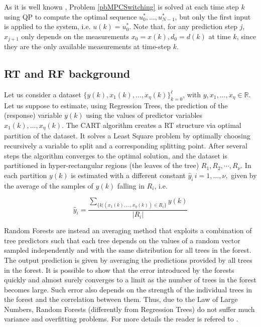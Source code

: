 \noindent As it is well known \cite{borrelli2017predictive}, Problem \ref{pbMPCSwitching} is solved at each time step $k$ using QP to compute the optimal sequence $u^*_0,\ldots,u^*_{N-1}$, but only the first input is applied to the system, i.e. $u(k) = u^*_0$. Note that, for any prediction step $j$, $x_{j+1}$ only depends on the measurements $x_0=x(k),d_0=d(k)$ at time $k$, since they are the only available measurements at time-step $k$. 


\subsection{RT and RF background} Let us consider a dataset $\{y(k),x_1(k),\ldots,x_\eta(k)\}_{k=0}^\ell$, with $y,x_1,\ldots,x_\eta\in\mathbb{R}$. Let us suppose  to estimate, using Regression Trees, the prediction of the (response) variable $y(k)$ using the values of predictor variables $x_1(k),\ldots,x_\eta(k)$. The CART algorithm \cite{BreimanCART2017} creates a RT structure via optimal partition of the dataset. It solves a Least Square problem by optimally choosing recursively a variable to split and a corresponding splitting point. After several steps the algorithm converges to the optimal solution, and the dataset is partitioned in hyper-rectangular regions (the leaves of the tree) $R_1, R_2,\cdots, R_\nu$. In each partition $y(k)$ is estimated with a different constant $\hat y_i\, i=1,\ldots,\nu,$ given by the average of the samples of $y(k)$ falling in $R_i$, i.e.

\begin{equation}\label{eqAverageResponseRT}
\hat y_{i} = \frac{\sum\limits_{\{k|(x_1(k),\ldots, x_\eta(k)) \in R_i\}}y(k)}{|R_i|}
\end{equation}


\noindent Random Forests \cite{BreimanML2001} are instead an averaging method that exploits a combination of tree predictors such that each tree depends on the values of a random vector sampled independently and with the same distribution for all trees in the forest. The output prediction is given by averaging the predictions provided by all trees in the forest. It is possible to show that the error introduced by the forests quickly and almost surely converges to a limit as the number of trees in the forest becomes large. Such error also depends on the strength of the individual trees in the forest and the correlation between them. Thus, due to the Law of Large Numbers, Random Forests (differently from Regression Trees) do not suffer much variance and overfitting problems. For more details the reader is refered to \cite{BreimanCART2017,BreimanML2001}.

